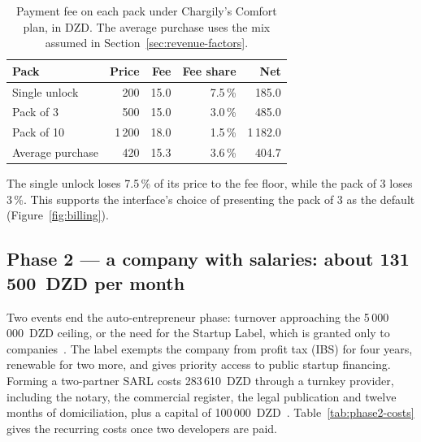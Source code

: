 \begin{table}[htbp]
\centering
\caption{Payment fee on each pack under Chargily's Comfort plan, in DZD. The
average purchase uses the mix assumed in Section~\ref{sec:revenue-factors}.}
\label{tab:fees}
\small
\begin{tabular}{@{}l r r r r@{}}
\toprule
\textbf{Pack} & \textbf{Price} & \textbf{Fee} & \textbf{Fee share} & \textbf{Net} \\
\midrule
Single unlock & 200    & 15.0 & 7.5\,\% & 185.0 \\
Pack of 3     & 500    & 15.0 & 3.0\,\% & 485.0 \\
Pack of 10    & 1\,200 & 18.0 & 1.5\,\% & 1\,182.0 \\
\midrule
Average purchase   & 420    & 15.3 & 3.6\,\% & 404.7 \\
\bottomrule
\end{tabular}
\end{table}

The single unlock loses 7.5\,\% of its price to the fee floor, while the pack of
3 loses 3\,\%. This supports the interface's choice of presenting the pack of 3
as the default (Figure~\ref{fig:billing}).

\subsection{Phase 2 --- a company with salaries: about 131\,500~DZD per month}

Two events end the auto-entrepreneur phase: turnover approaching the
5\,000\,000~DZD ceiling, or the need for the Startup Label, which is granted only
to companies~\cite{startuplabel2026}. The label exempts the company from profit
tax (IBS) for four years, renewable for two more, and gives priority access to
public startup financing. Forming a two-partner SARL costs 283\,610~DZD through
a turnkey provider, including the notary, the commercial register, the legal
publication and twelve months of domiciliation, plus a capital of
100\,000~DZD~\cite{creation2026}. Table~\ref{tab:phase2-costs} gives the
recurring costs once two developers are paid.

